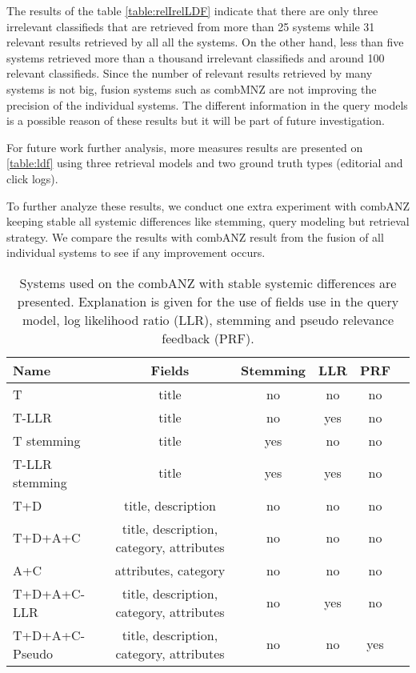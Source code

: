 The results of the table \ref{table:relIrelLDF} indicate that there are only three irrelevant classifieds that are retrieved from more than 25 systems while 31 relevant results retrieved by all all the systems. On the other hand, less than five systems retrieved more than a thousand irrelevant classifieds and around 100 relevant classifieds.  Since the number of relevant results retrieved by many systems is not big, fusion systems such as combMNZ are not improving the precision of the individual systems. The different information in the query models is a possible reason of these results but it will be part of future investigation.


For future work further analysis, more measures results are presented on \ref{table:ldf} using three retrieval models and two ground truth types (editorial and click logs).

To further analyze these results, we conduct one extra experiment with combANZ keeping stable all systemic differences like stemming, query modeling but retrieval strategy. We compare the results with combANZ result from the fusion of all individual systems to see if any improvement occurs.



\begin{table}[H]
\begin{center}
\scriptsize
\caption{Systems used on the combANZ with stable systemic differences are presented. Explanation is given for the use of fields use in the query model, log likelihood ratio (LLR), stemming and pseudo relevance feedback (PRF). }
\label{table:combANZSystems}

\begin{tabular}{lccccr}
\midrule
Name & Fields & Stemming & LLR & PRF \\
\midrule
T & title & no & no & no \\
T-LLR & title & no & yes & no \\
T stemming & title & yes & no & no \\
T-LLR stemming & title & yes & yes & no \\
T+D  & title, description & no & no & no \\
T+D+A+C & title, description, category, attributes & no & no & no \\
A+C & attributes, category & no & no & no \\
T+D+A+C-LLR & title, description, category, attributes & no & yes & no \\
T+D+A+C-Pseudo & title, description, category, attributes & no & no & yes \\
\bottomrule
\end{tabular}
\end{center}
\end{table}



